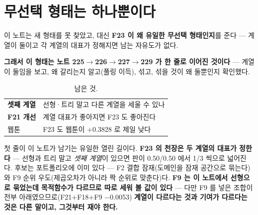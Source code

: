 \documentclass[10pt]{article}
\begin{document}
\section{무선택 형태는 하나뿐이다}

{이 노트는 새 형태를 못 찾았고, 대신 \textbf{F23 이 왜 유일한 무선택
형태인지}를 준다 --- 계열이 둘이고 각 계열의 대표가 정해지면 남는
자유도가 없다.}

{\textbf{그래서 이 형태는 노트 225$\to$226$\to$227$\to$229 가 한 줄로
이어진 것이다} --- 계열이 둘임을 보고, 왜 갈리는지 알고(풀링 이득),
섞고, 섞을 것이 왜 둘뿐인지 확인했다.}

\begin{table}[t]
\centering\tsize
\caption{남은 것.}
\begin{tabular}{ll}
\toprule
\textbf{셋째 계열} & 선형·트리 말고 다른 계열을 세울 수 있나 \\
\textbf{F21 개선} & 계열 대표가 좋아지면 F23 도 좋아진다 \\
웹툰 & F23 도 웹툰이 $+$0.3828 로 제일 낮다 \\
\bottomrule
\end{tabular}
\end{table}

첫 줄이 이 노트가 남기는 유일한 열린 길이다. \textbf{F23 의 천장은 두
계열의 대표가 정한다} --- 선형과 트리 말고 \emph{셋째 계열}이 있으면 판이
0.50/0.50 에서 1/3 씩으로 넓어진다. 후보는 포트폴리오에 이미 있다 ---
F2 결합 잠재(도메인을 잠재 공간으로 묶는다)와 F9 순위 우도(제곱오차가
아니라 짝 순위로 맞춘다)다. \textbf{F9 는 이 노트에서 선형으로 묶었는데
목적함수가 다르므로 따로 세워 볼 값이 있다} --- 다만 F9 를 넣은 조합이
전부 아래였으므로(F21$+$F18$+$F9 $-$0.0053) \textbf{계열이 다르다는 것과
기여가 다르다는 것은 다른 말이고, 그것부터 재야 한다.}
\end{document}
